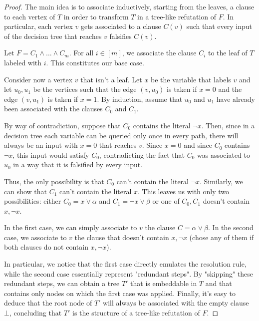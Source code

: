 \begin{proof}

    The main idea is to associate inductively, starting from the leaves, a clause to each vertex of $T$ in order to transform $T$ in a tree-like refutation of $F$. In particular, each vertex $v$ gets associated to a clause $C(v)$ such that every input of the decision tree that reaches $v$ falsifies $C(v)$.

    Let $F = C_1 \land \ldots \land C_m$. For all $i \in [m]$, we associate the clause $C_i$ to the leaf of $T$ labeled with $i$. This constitutes our base case.

    Consider now a vertex $v$ that isn't a leaf. Let $x$ be the variable that labels $v$ and let $u_0, u_1$ be the vertices such that the edge $(v, u_0)$ is taken if $x = 0$ and the edge $(v, u_1)$ is taken if $x = 1$.  By induction, assume that $u_0$ and $u_1$ have already been associated with the clauses $C_0$ and $C_1$.

    By way of contradiction, suppose that $C_0$ contains the literal $\lnot{x}$. Then, since in a decision tree each variable can be queried only once in every path, there will always be an input with $x = 0$ that reaches $v$. Since $x = 0$ and since $C_0$ contains $\lnot{x}$, this input would satisfy $C_0$, contradicting the fact that $C_0$ was associated to $u_0$ in a way that it is falsified by every input.

    Thus, the only possibility is that $C_0$ can't contain the literal $\lnot{x}$. Similarly, we can show that $C_1$ can't contain the literal $x$. This leaves us with only two possibilities: either $C_0 = x \lor \alpha$ and $C_1 = \lnot{x} \lor \beta$ or one of $C_0, C_1$ doesn't contain $x, \lnot{x}$.

    In the first case, we can simply associate to $v$ the clause $C = \alpha \lor \beta$.  In the second case, we associate to $v$ the clause that doesn't contain $x, \lnot{x}$ (chose any of them if both clauses do not contain $x, \lnot{x}$).

    In particular, we notice that the first case directly emulates the resolution rule, while the second case essentially represent "redundant steps". By "skipping" these redundant steps, we can obtain a tree $T'$ that is embeddable in $T$ and that contains only nodes on which the first case was applied. Finally, it's easy to deduce that the root node of $T'$ will always be associated with the empty clause $\bot$, concluding that $T'$ is the structure of a tree-like refutation of $F$.

\end{proof}

